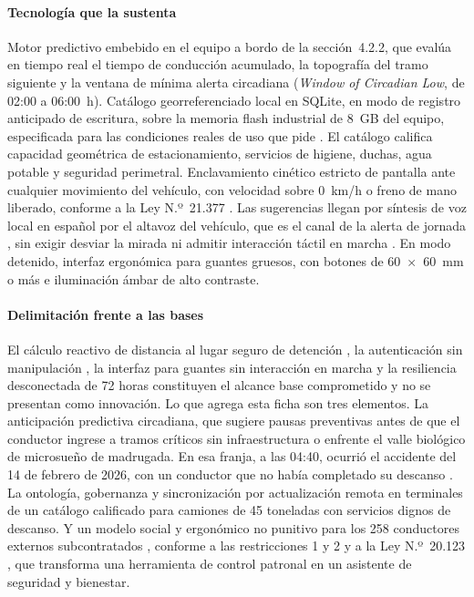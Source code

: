\paragraph{Tecnología que la sustenta} Motor predictivo embebido en el equipo a bordo de la
sección~4.2.2, que evalúa en tiempo real el tiempo de conducción acumulado, la
topografía del tramo siguiente y la ventana de mínima alerta circadiana (\emph{Window of Circadian
Low}, de 02:00 a 06:00~h). Catálogo georreferenciado local en SQLite, en modo de registro anticipado de escritura, sobre la
memoria flash industrial de 8~GB del equipo, especificada para las condiciones reales de uso que pide
. El catálogo califica
capacidad geométrica de estacionamiento, servicios de higiene, duchas, agua potable y seguridad
perimetral. Enclavamiento cinético estricto de pantalla ante cualquier movimiento del vehículo, con
velocidad sobre 0~km/h o freno de mano liberado, conforme a la Ley N.º~21.377 \parencite{ley21377}.
Las sugerencias llegan por síntesis de voz local en español por el altavoz del vehículo, que es el
canal de la alerta de jornada , sin exigir desviar la mirada ni admitir
interacción táctil en marcha . En modo detenido, interfaz ergonómica para guantes gruesos, con botones
de 60~×~60~mm o más e iluminación ámbar de alto contraste.

\paragraph{Delimitación frente a las bases} El cálculo reactivo de distancia al lugar seguro de
detención , la autenticación sin manipulación , la interfaz
para guantes sin interacción en marcha  y la resiliencia desconectada de 72 horas
 constituyen el alcance base comprometido y no se presentan como
innovación. Lo que agrega esta ficha son tres elementos. La anticipación predictiva circadiana, que
sugiere pausas preventivas antes de que el conductor ingrese a tramos críticos sin infraestructura o
enfrente el valle biológico de microsueño de madrugada. En esa franja, a las 04:40, ocurrió el
accidente del 14 de febrero de 2026, con un conductor que no había completado su descanso
. La ontología, gobernanza y sincronización por actualización remota en terminales de un catálogo calificado para
camiones de 45 toneladas con servicios dignos de descanso. Y un modelo social y ergonómico no punitivo
para los 258 conductores externos subcontratados , conforme a las restricciones 1
y 2  y a la Ley N.º~20.123 \parencite{ley20123}, que transforma una herramienta de control patronal en
un asistente de seguridad y bienestar.

